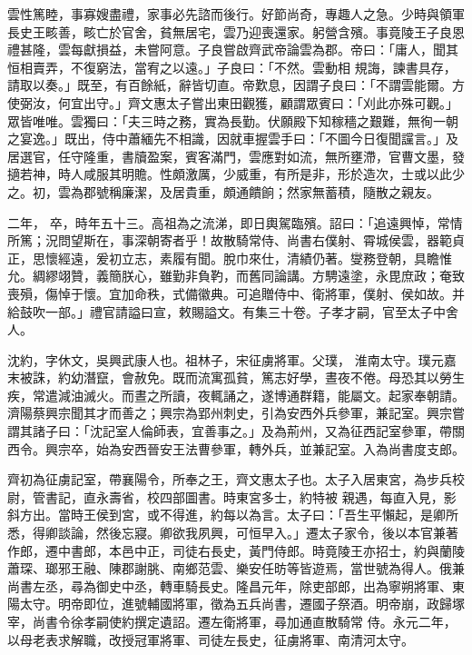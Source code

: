 \begin{pinyinscope}
 雲性篤睦，事寡嫂盡禮，家事必先諮而後行。好節尚奇，專趣人之急。少時與領軍長史王畡善，畡亡於官舍，貧無居宅，雲乃迎喪還家。躬營含殯。事竟陵王子良恩禮甚隆，雲每獻損益，未嘗阿意。子良嘗啟齊武帝論雲為郡。帝曰：「庸人，聞其恒相賣弄，不復窮法，當宥之以遠。」子良曰：「不然。雲動相
 規誨，諫書具存，請取以奏。」既至，有百餘紙，辭皆切直。帝歎息，因謂子良曰：「不謂雲能爾。方使弼汝，何宜出守。」齊文惠太子嘗出東田觀獲，顧謂眾賓曰：「刈此亦殊可觀。」眾皆唯唯。雲獨曰：「夫三時之務，實為長勤。伏願殿下知稼穡之艱難，無徇一朝之宴逸。」既出，侍中蕭緬先不相識，因就車握雲手曰：「不圖今日復聞讜言。」及居選官，任守隆重，書牘盈案，賓客滿門，雲應對如流，無所壅滯，官曹文墨，發擿若神，時人咸服其明贍。性頗激厲，少威重，有所是非，形於造次，士或以此少之。初，雲為郡號稱廉潔，及居貴重，頗通饋餉；然家無蓄積，隨散之親友。



 二年，
 卒，時年五十三。高祖為之流涕，即日輿駕臨殯。詔曰：「追遠興悼，常情所篤；況問望斯在，事深朝寄者乎！故散騎常侍、尚書右僕射、霄城侯雲，器範貞正，思懷經遠，爰初立志，素履有聞。脫巾來仕，清績仍著。燮務登朝，具瞻惟允。綢繆翊贊，義簡朕心，雖勤非負靮，而舊同論講。方騁遠塗，永毘庶政；奄致喪殞，傷悼于懷。宜加命秩，式備徽典。可追贈侍中、衛將軍，僕射、侯如故。并給鼓吹一部。」禮官請謚曰宣，敕賜謚文。有集三十卷。子孝才嗣，官至太子中舍人。



 沈約，字休文，吳興武康人也。祖林子，宋征虜將軍。父璞，
 淮南太守。璞元嘉末被誅，約幼潛竄，會赦免。既而流寓孤貧，篤志好學，晝夜不倦。母恐其以勞生疾，常遣減油滅火。而晝之所讀，夜輒誦之，遂博通群籍，能屬文。起家奉朝請。濟陽蔡興宗聞其才而善之；興宗為郢州刺史，引為安西外兵參軍，兼記室。興宗嘗謂其諸子曰：「沈記室人倫師表，宜善事之。」及為荊州，又為征西記室參軍，帶關西令。興宗卒，始為安西晉安王法曹參軍，轉外兵，並兼記室。入為尚書度支郎。



 齊初為征虜記室，帶襄陽令，所奉之王，齊文惠太子也。太子入居東宮，為步兵校尉，管書記，直永壽省，校四部圖書。時東宮多士，約特被
 親遇，每直入見，影斜方出。當時王侯到宮，或不得進，約每以為言。太子曰：「吾生平懶起，是卿所悉，得卿談論，然後忘寢。卿欲我夙興，可恒早入。」遷太子家令，後以本官兼著作郎，遷中書郎，本邑中正，司徒右長史，黃門侍郎。時竟陵王亦招士，約與蘭陵蕭琛、瑯邪王融、陳郡謝朓、南鄉范雲、樂安任昉等皆遊焉，當世號為得人。俄兼尚書左丞，尋為御史中丞，轉車騎長史。隆昌元年，除吏部郎，出為寧朔將軍、東陽太守。明帝即位，進號輔國將軍，徵為五兵尚書，遷國子祭酒。明帝崩，政歸塚宰，尚書令徐孝嗣使約撰定遺詔。遷左衛將軍，尋加通直散騎常
 侍。永元二年，以母老表求解職，改授冠軍將軍、司徒左長史，征虜將軍、南清河太守。




\end{pinyinscope}
